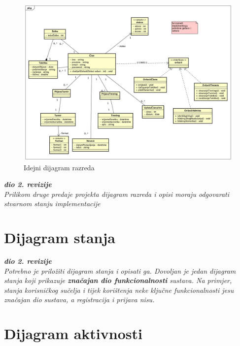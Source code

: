 			\eject
			
			\begin{figure}[H]
					\centerfloat
					\advance{}
        					\includegraphics[scale=0.35]{dijagrami/Classdiagram.jpg} %
        					\caption{Idejni dijagram razreda}
        					\label{fig:idejniDijagramRazreda}
				\end{figure}

			
			\textbf{\textit{dio 2. revizije}}\\			
			
			\textit{Prilikom druge predaje projekta dijagram razreda i opisi moraju odgovarati stvarnom stanju implementacije}
			
			
			
			\eject
		
		\section{Dijagram stanja}
			
			
			\textbf{\textit{dio 2. revizije}}\\
			
			\textit{Potrebno je priložiti dijagram stanja i opisati ga. Dovoljan je jedan dijagram stanja koji prikazuje \textbf{značajan dio funkcionalnosti} sustava. Na primjer, stanja korisničkog sučelja i tijek korištenja neke ključne funkcionalnosti jesu značajan dio sustava, a registracija i prijava nisu. }
			
			
			\eject 
		
		\section{Dijagram aktivnosti}
			
